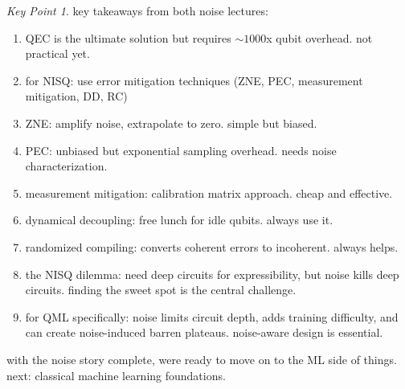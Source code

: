 \documentclass[11pt,a4paper]{article}
\theoremstyle{definition}
\theoremstyle{remark}
\newtheorem*{keypoint}{Key Point}
\begin{document}
\begin{keypoint}
key takeaways from both noise lectures:
\begin{enumerate}
    \item QEC is the ultimate solution but requires $\sim 1000$x qubit overhead. not practical yet.
    \item for NISQ: use error mitigation techniques (ZNE, PEC, measurement mitigation, DD, RC)
    \item ZNE: amplify noise, extrapolate to zero. simple but biased.
    \item PEC: unbiased but exponential sampling overhead. needs noise characterization.
    \item measurement mitigation: calibration matrix approach. cheap and effective.
    \item dynamical decoupling: free lunch for idle qubits. always use it.
    \item randomized compiling: converts coherent errors to incoherent. always helps.
    \item the NISQ dilemma: need deep circuits for expressibility, but noise kills deep circuits. finding the sweet spot is the central challenge.
    \item for QML specifically: noise limits circuit depth, adds training difficulty, and can create noise-induced barren plateaus. noise-aware design is essential.
\end{enumerate}
\end{keypoint}

with the noise story complete, were ready to move on to the ML side of things. next: classical machine learning foundations.
\end{document}
